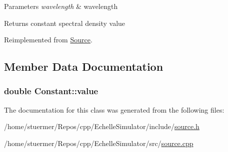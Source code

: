 \begin{DoxyParams}{Parameters}
{\em wavelength} & wavelength \\
\hline
\end{DoxyParams}
\begin{DoxyReturn}{Returns}
constant spectral density value 
\end{DoxyReturn}


Reimplemented from \hyperlink{class_source_a546ae8ec1ae47e888c74f146278e19af}{Source}.



\subsection{Member Data Documentation}
\subsubsection[{\texorpdfstring{value}{value}}]{\setlength{\rightskip}{0pt plus 5cm}double Constant\+::value\hspace{0.3cm}{\ttfamily [private]}}\hypertarget{class_constant_ac48c9f0bb497a075190f43f2981ac5e7}{}\label{class_constant_ac48c9f0bb497a075190f43f2981ac5e7}


The documentation for this class was generated from the following files\+:\begin{DoxyCompactItemize}
\item 
/home/stuermer/\+Repos/cpp/\+Echelle\+Simulator/include/\hyperlink{source_8h}{source.\+h}\item 
/home/stuermer/\+Repos/cpp/\+Echelle\+Simulator/src/\hyperlink{source_8cpp}{source.\+cpp}\end{DoxyCompactItemize}
